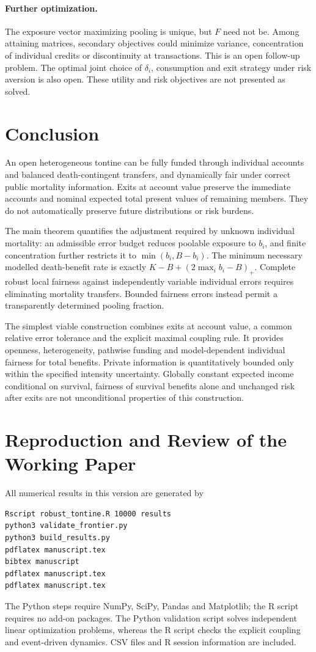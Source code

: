 \documentclass[11pt,a4paper]{article}
\theoremstyle{definition}\newtheorem{definition}[theorem]{Definition}
\theoremstyle{remark}\newtheorem{remark}[theorem]{Remark}
\begin{document}
\paragraph{Further optimization.} The exposure vector maximizing pooling is unique, but $F$ need not be. Among attaining matrices, secondary objectives could minimize variance, concentration of individual credits or discontinuity at transactions. This is an open follow-up problem. The optimal joint choice of $\delta_i$, consumption and exit strategy under risk aversion is also open. These utility and risk objectives are not presented as solved.

\section{Conclusion}
An open heterogeneous tontine can be fully funded through individual accounts and balanced death-contingent transfers, and dynamically fair under correct public mortality information. Exits at account value preserve the immediate accounts and nominal expected total present values of remaining members. They do not automatically preserve future distributions or risk burdens.

The main theorem quantifies the adjustment required by unknown individual mortality: an admissible error budget reduces poolable exposure to $b_i$, and finite concentration further restricts it to $\min(b_i,B-b_i)$. The minimum necessary modelled death-benefit rate is exactly $K-B+(2\max_i b_i-B)_+$. Complete robust local fairness against independently variable individual errors requires eliminating mortality transfers. Bounded fairness errors instead permit a transparently determined pooling fraction.

The simplest viable construction combines exits at account value, a common relative error tolerance and the explicit maximal coupling rule. It provides openness, heterogeneity, pathwise funding and model-dependent individual fairness for total benefits. Private information is quantitatively bounded only within the specified intensity uncertainty. Globally constant expected income conditional on survival, fairness of survival benefits alone and unchanged risk after exits are not unconditional properties of this construction.

\appendix
\section{Reproduction and Review of the Working Paper}
All numerical results in this version are generated by
\begin{verbatim}
Rscript robust_tontine.R 10000 results
python3 validate_frontier.py
python3 build_results.py
pdflatex manuscript.tex
bibtex manuscript
pdflatex manuscript.tex
pdflatex manuscript.tex
\end{verbatim}
The Python steps require NumPy, SciPy, Pandas and Matplotlib; the R script requires no add-on packages. The Python validation script solves independent linear optimization problems, whereas the R script checks the explicit coupling and event-driven dynamics. CSV files and R session information are included.
\end{document}
